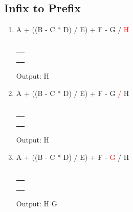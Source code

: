 \documentclass[a4paper]{article}
\begin{document}
\begin{large}
  \newpage
  \subsection{Infix to Prefix}

  \begin{enumerate}
    \renewcommand{\arraystretch}{1.3}
    \item
          A + ((B - C * D) / E) + F - G / \textcolor{red}{H}\\
          \\
          \begin{tabular}[t]{ | p{1em} | } \\ \hline
            \\ \hline \\ \hline \\ \hline \\ \hline
          \end{tabular}
          \hspace{2em}
          Output: H

          \renewcommand{\arraystretch}{1.3}
    \item
          A + ((B - C * D) / E) + F - G  \textcolor{red}{/} H\\
          \\
          \begin{tabular}[t]{ | p{1em} | }
            \\ \hline
            \\ \hline \\ \hline \\ \hline
            \makecell{/} \\
            \hline
          \end{tabular}
          \hspace{2em}
          Output: H

          \renewcommand{\arraystretch}{1.3}
    \item
          A + ((B - C * D) / E) + F - \textcolor{red}{G} / H\\
          \\
          \begin{tabular}[t]{ | p{1em} | }
            \\ \hline
            \\ \hline \\ \hline \\ \hline
            \makecell{/} \\
            \hline
          \end{tabular}
          \hspace{2em}
          Output: H G


\end{enumerate}
\end{large}
\end{document}
